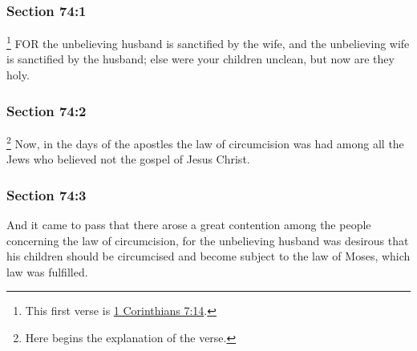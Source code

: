 	\subsubsection{Section 74:1} %
		\label{DC74-1}

			\footnote{%
				This first verse is \hyperref[1CORINTHIANS-7-14]{1 Corinthians 7:14}.
				}%
		FOR the unbelieving husband is sanctified by the wife, and the unbelieving wife is sanctified by the husband; else were your children unclean, but now are they holy.


	\subsubsection{Section 74:2} %
		\label{DC74-2}

			\footnote{%
				Here begins the explanation of the verse.
				}%
		Now, in the days of the apostles the law of circumcision was had among all the Jews who believed not the gospel of Jesus Christ.


	\subsubsection{Section 74:3} %
		\label{DC74-3}

		And it came to pass that there arose a great contention among the people concerning the law of circumcision, for the unbelieving husband was desirous that his children should be circumcised and become subject to the law of Moses, which law was fulfilled.

